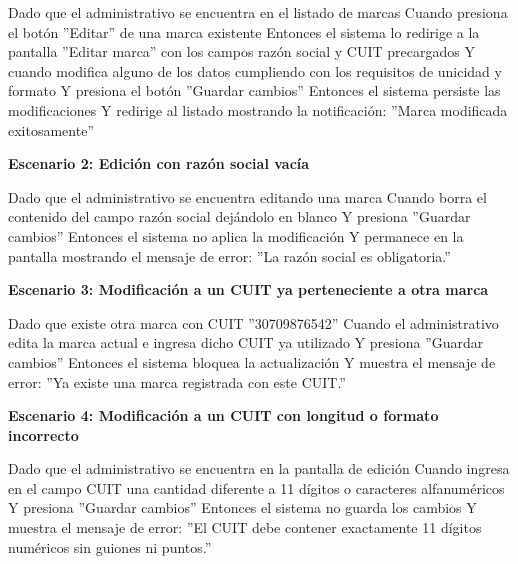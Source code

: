 \documentclass[a4paper,9pt]{article}
\begin{document}
\begin{tcolorbox}[hucard, title={\textbf{HU-241: EDITAR MARCA} \hfill \scriptsize \colorbox{slatestatus}{\textbf{\ Done\ }} \quad \colorbox{white}{\textcolor{primarydark}{\textbf{\ 3 pts\ }}}}]
{Dado que el administrativo se encuentra en el listado de marcas Cuando presiona el botón ''Editar'' de una marca existente Entonces el sistema lo redirige a la pantalla ''Editar marca'' con los campos razón social y CUIT precargados Y cuando modifica alguno de los datos cumpliendo con los requisitos de unicidad y formato Y presiona el botón ''Guardar cambios'' Entonces el sistema persiste las modificaciones Y redirige al listado mostrando la notificación: ''Marca modificada exitosamente''\par\vspace{2.5pt}
\noindent\textbf{\textcolor{secondarydark}{Escenario 2:  Edición con razón social vacía}}\par\vspace{1pt}
Dado que el administrativo se encuentra editando una marca Cuando borra el contenido del campo razón social dejándolo en blanco Y presiona ''Guardar cambios'' Entonces el sistema no aplica la modificación Y permanece en la pantalla mostrando el mensaje de error: ''La razón social es obligatoria.''\par\vspace{2.5pt}
\noindent\textbf{\textcolor{secondarydark}{Escenario 3:  Modificación a un CUIT ya perteneciente a otra marca}}\par\vspace{1pt}
Dado que existe otra marca con CUIT ''30709876542'' Cuando el administrativo edita la marca actual e ingresa dicho CUIT ya utilizado Y presiona ''Guardar cambios'' Entonces el sistema bloquea la actualización Y muestra el mensaje de error: ''Ya existe una marca registrada con este CUIT.''\par\vspace{2.5pt}
\noindent\textbf{\textcolor{secondarydark}{Escenario 4:  Modificación a un CUIT con longitud o formato incorrecto}}\par\vspace{1pt}
Dado que el administrativo se encuentra en la pantalla de edición Cuando ingresa en el campo CUIT una cantidad diferente a 11 dígitos o caracteres alfanuméricos Y presiona ''Guardar cambios'' Entonces el sistema no guarda los cambios Y muestra el mensaje de error: ''El CUIT debe contener exactamente 11 dígitos numéricos sin guiones ni puntos.''\par\vspace{2.5pt}
}\par
\end{tcolorbox}
\end{document}
